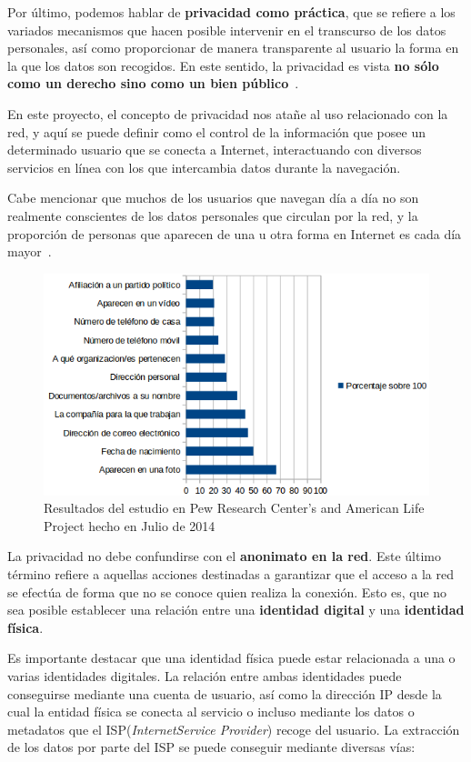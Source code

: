 Por último, podemos hablar de \textbf{privacidad como práctica}, que se refiere a los variados mecanismos que hacen posible intervenir en el transcurso de los datos personales, así como proporcionar de manera transparente al usuario la forma en la que los datos son recogidos. En este sentido, la privacidad es vista \textbf{no sólo como un derecho sino como un bien público}~\cite{lane2014privacy}.

En este proyecto, el concepto de privacidad nos atañe al uso relacionado con la red, y aquí se puede definir como el control de la información que posee un determinado usuario que se conecta a Internet, interactuando con diversos servicios en línea con los que intercambia datos durante la navegación. 

Cabe mencionar que muchos de los usuarios que navegan día a día no son realmente conscientes de los datos personales que circulan por la red, y la proporción de personas que aparecen de una u otra forma en Internet es cada día mayor~\cite{article:concernidos}.

\begin{figure}[H]
	\centerline{
		\mbox{\includegraphics[width=5.00in]{images/chart_privacy.png}}
	}
	\caption{Resultados del estudio en Pew Research Center's and American Life Project hecho en Julio de 2014~\cite{article:pew} }
	\label{fig:estudioPew}
\end{figure}

La privacidad no debe confundirse con el \textbf{anonimato en la red}. Este último término refiere a aquellas acciones destinadas a garantizar que el acceso a la red se efectúa de forma que no se conoce quien realiza la conexión. Esto es, que no sea posible establecer una relación entre una \textbf{identidad digital} y una \textbf{identidad física}.

Es importante destacar que una identidad física puede estar relacionada a una o varias identidades digitales. La relación entre ambas identidades puede conseguirse mediante una cuenta de usuario, así como la dirección IP desde la cual la entidad física se conecta al servicio o incluso mediante los datos o metadatos que el ISP(\textit{InternetService Provider}) recoge del usuario. La extracción de los datos por parte del ISP se puede conseguir mediante diversas vías:

